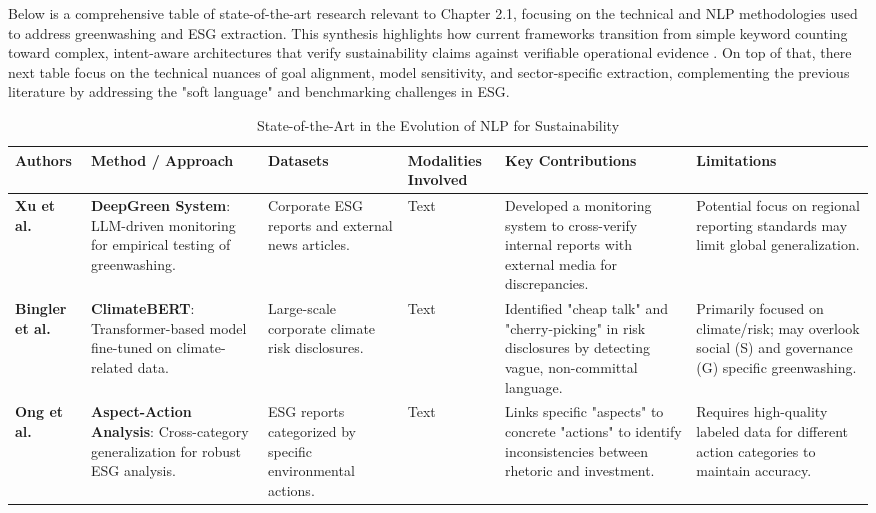 \documentclass[english, online, cse, master]{dithesis}
\begin{document}
Below is a comprehensive table of state-of-the-art research relevant to Chapter 2.1, focusing on the technical and NLP methodologies used to address greenwashing and ESG extraction. This synthesis highlights how current frameworks transition from simple keyword counting toward complex, intent-aware architectures that verify sustainability claims against verifiable operational evidence  \parencite{keane_ong_0a5de439}. On top of that, there next table focus on the technical nuances of goal alignment, model sensitivity, and sector-specific extraction, complementing the previous literature by addressing the "soft language" and benchmarking challenges in ESG.



\begin{landscape}
\begin{table}[p]
\centering
\caption{State-of-the-Art in the Evolution of NLP for Sustainability}
\label{tab:nlp-evolution-sustainability-1}
\small
\renewcommand{\arraystretch}{1.2}
\begin{tabularx}{\linewidth}{|p{1.8cm}|X|X|p{1.8cm}|X|X|}
\hline
Authors & Method / Approach & Datasets & Modalities Involved & Key Contributions & Limitations \\ \hline
\textbf{Xu et al.}  \parencite{chong_xu_bff21576} & \textbf{DeepGreen System}: LLM-driven monitoring for empirical testing of greenwashing. & Corporate ESG reports and external news articles. & Text & Developed a monitoring system to cross-verify internal reports with external media for discrepancies. & Potential focus on regional reporting standards may limit global generalization. \\ \hline
\textbf{Bingler et al.}  \parencite{julia_bingler_268445e3} & \textbf{ClimateBERT}: Transformer-based model fine-tuned on climate-related data. & Large-scale corporate climate risk disclosures. & Text & Identified "cheap talk" and "cherry-picking" in risk disclosures by detecting vague, non-committal language. & Primarily focused on climate/risk; may overlook social (S) and governance (G) specific greenwashing. \\ \hline
\textbf{Ong et al.}  \parencite{keane_ong_369a0b63} & \textbf{Aspect-Action Analysis}: Cross-category generalization for robust ESG analysis. & ESG reports categorized by specific environmental actions. & Text & Links specific "aspects" to concrete "actions" to identify inconsistencies between rhetoric and investment. & Requires high-quality labeled data for different action categories to maintain accuracy. \\ \hline

\end{tabularx}
\end{table}
\end{landscape}
\end{document}
